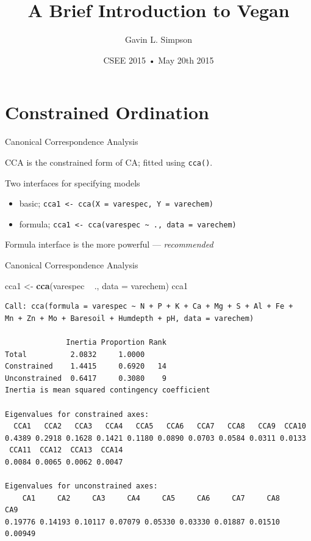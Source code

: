 \documentclass[10pt,ignorenonframetext,compress, aspectratio=169]{beamer}
\title{A Brief Introduction to Vegan}
\author{Gavin L. Simpson}
\date{CSEE 2015 • May 20th 2015}
\newenvironment{Shaded}{\begin{snugshade}}{\end{snugshade}}
\newcommand{\KeywordTok}[1]{\textcolor[rgb]{0.13,0.29,0.53}{\textbf{{#1}}}}
\newcommand{\DataTypeTok}[1]{\textcolor[rgb]{0.13,0.29,0.53}{{#1}}}
\newcommand{\StringTok}[1]{\textcolor[rgb]{0.31,0.60,0.02}{{#1}}}
\newcommand{\NormalTok}[1]{{#1}}
\begin{document}
\frame{\titlepage}

\section{Constrained Ordination}\label{constrained-ordination}

\begin{frame}{Canonical Correspondence Analysis}

CCA is the constrained form of CA; fitted using \texttt{cca()}.

Two interfaces for specifying models

\begin{itemize}
\itemsep1pt\parskip0pt
\item
  basic; \texttt{cca1 \textless{}- cca(X = varespec, Y = varechem)}
\item
  formula;
  \texttt{cca1 \textless{}- cca(varespec \textasciitilde{} ., data = varechem)}
\end{itemize}

Formula interface is the more powerful --- \emph{recommended}

\end{frame}

\begin{frame}[fragile]{Canonical Correspondence Analysis}

\tiny

\begin{Shaded}
\begin{Highlighting}[]
\NormalTok{cca1 <-}\StringTok{ }\KeywordTok{cca}\NormalTok{(varespec ~}\StringTok{ }\NormalTok{., }\DataTypeTok{data =} \NormalTok{varechem)}
\NormalTok{cca1}
\end{Highlighting}
\end{Shaded}

\begin{verbatim}
Call: cca(formula = varespec ~ N + P + K + Ca + Mg + S + Al + Fe +
Mn + Zn + Mo + Baresoil + Humdepth + pH, data = varechem)

              Inertia Proportion Rank
Total          2.0832     1.0000     
Constrained    1.4415     0.6920   14
Unconstrained  0.6417     0.3080    9
Inertia is mean squared contingency coefficient 

Eigenvalues for constrained axes:
  CCA1   CCA2   CCA3   CCA4   CCA5   CCA6   CCA7   CCA8   CCA9  CCA10 
0.4389 0.2918 0.1628 0.1421 0.1180 0.0890 0.0703 0.0584 0.0311 0.0133 
 CCA11  CCA12  CCA13  CCA14 
0.0084 0.0065 0.0062 0.0047 

Eigenvalues for unconstrained axes:
    CA1     CA2     CA3     CA4     CA5     CA6     CA7     CA8     CA9 
0.19776 0.14193 0.10117 0.07079 0.05330 0.03330 0.01887 0.01510 0.00949 
\end{verbatim}

\normalsize

\end{frame}
\end{document}
